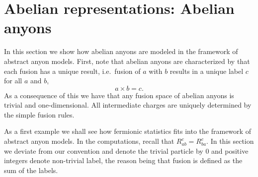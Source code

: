 \documentclass[a4paper,10pt,oneside]{book}
\theoremstyle{plain}
\theoremstyle{definition}
\theoremstyle{remark}
\begin{document}
\section{Abelian representations: Abelian anyons}

In this section we show how abelian anyons are modeled in the framework of abstract anyon models. First, note that abelian anyons are characterized by that each fusion has a unique result, i.e.\ fusion of $a$ with $b$ results in a unique label $c$ for all $a$ and $b$,
\begin{equation}
  a \times b = c.
\end{equation}
As a consequence of this we have that any fusion space of abelian anyons is trivial and one-dimensional. All intermediate charges are uniquely determined by the simple fusion rules.

As a first example we shall see how fermionic statistics fits into the framework of abstract anyon models. In the computations, recall that $R_{ab}^c = R_{ba}^c$. In this section we deviate from our convention and denote the trivial particle by $0$ and positive integers denote non-trivial label, the reason being that fusion is defined as the sum of the labels.
\end{document}
